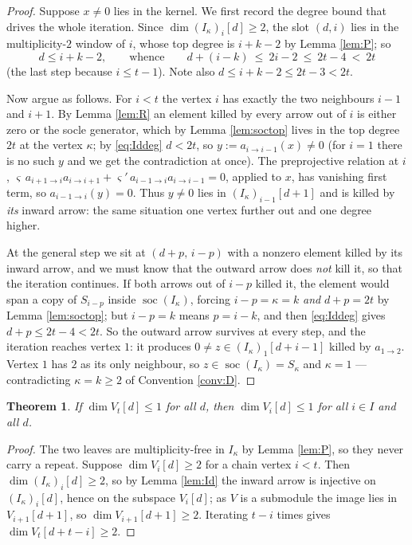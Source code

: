 \documentclass[reqno]{amsart}
\theoremstyle{plain}
\newtheorem{theorem}{Theorem}[section]
\theoremstyle{definition}
\DeclareMathOperator{\soc}{soc}
\newcommand{\ka}{\kappa}
\begin{document}
\begin{proof}
Suppose $x\ne0$ lies in the kernel.  We first record the degree bound that
drives the whole iteration.  Since $\dim(I_\ka)_i[d]\ge2$, the slot $(d,i)$
lies in the multiplicity-$2$ window of $i$, whose top degree is $i+k-2$ by
Lemma \ref{lem:P}; so
\begin{equation}\label{eq:Iddeg}
   d\le i+k-2,
   \qquad\text{whence}\qquad
   d+(i-k)\ \le\ 2i-2\ \le\ 2t-4\ <\ 2t
\end{equation}
(the last step because $i\le t-1$).  Note also $d\le i+k-2\le 2t-3<2t$.

Now argue as follows.  For $i<t$ the vertex $i$ has exactly the two neighbours
$i-1$ and $i+1$.  By Lemma \ref{lem:R} an element killed by every arrow out of
$i$ is either zero or the socle generator, which by Lemma \ref{lem:soctop}
lives in the top degree $2t$ at the vertex $\ka$; by \eqref{eq:Iddeg}
$d<2t$, so $y:=a_{i\to i-1}(x)\ne0$ (for $i=1$ there is no such
$y$ and we get the contradiction at once).  The preprojective relation at $i$,
$\varsigma\,a_{i+1\to i}a_{i\to i+1}+\varsigma'\,a_{i-1\to i}a_{i\to i-1}=0$, applied to
$x$, has vanishing first term, so $a_{i-1\to i}(y)=0$.  Thus $y\ne0$ lies in
$(I_\ka)_{i-1}[d+1]$ and is killed by \emph{its} inward arrow: the same
situation one vertex further out and one degree higher.

At the general step we sit at $(d+p,\,i-p)$ with a nonzero element killed by
its inward arrow, and we must know that the outward arrow does \emph{not} kill
it, so that the iteration continues.  If both arrows out of $i-p$ killed it,
the element would span a copy of $S_{i-p}$ inside $\soc(I_\ka)$, forcing
$i-p=\ka=k$ \emph{and} $d+p=2t$ by Lemma \ref{lem:soctop}; but $i-p=k$ means
$p=i-k$, and then \eqref{eq:Iddeg} gives $d+p\le2t-4<2t$.  So the outward
arrow survives at every step, and the iteration reaches vertex $1$: it
produces $0\ne z\in(I_\ka)_1[d+i-1]$ killed by $a_{1\to2}$.  Vertex $1$ has
$2$ as its only neighbour, so $z\in\soc(I_\ka)=S_\ka$ and $\ka=1$ ---
contradicting $\ka=k\ge2$ of Convention \ref{conv:D}.
\end{proof}

\begin{theorem}\label{thm:lemA}
If $\dim V_t[d]\le1$ for all $d$, then $\dim V_i[d]\le1$ for all $i\in I$ and
all $d$.
\end{theorem}

\begin{proof}
The two leaves are multiplicity-free in $I_\ka$ by Lemma \ref{lem:P}, so they
never carry a repeat.  Suppose $\dim V_i[d]\ge2$ for a chain vertex $i<t$.
Then $\dim(I_\ka)_i[d]\ge2$, so by Lemma \ref{lem:Id} the inward arrow is
injective on $(I_\ka)_i[d]$, hence on the subspace $V_i[d]$; as $V$ is a
submodule the image lies in $V_{i+1}[d+1]$, so $\dim V_{i+1}[d+1]\ge2$.
Iterating $t-i$ times gives $\dim V_t[d+t-i]\ge2$.
\end{proof}
\end{document}
